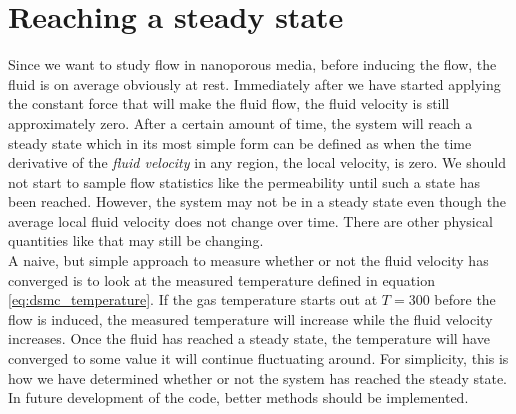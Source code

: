 \section{Reaching a steady state}
\label{sec:dsmc_steady_state}
Since we want to study flow in nanoporous media, before inducing the flow, the fluid is on average obviously at rest. Immediately after we have started applying the constant force that will make the fluid flow, the fluid velocity is still approximately zero. After a certain amount of time, the system will reach a steady state which in its most simple form can be defined as when the time derivative of the \textit{fluid velocity} in any region, the local velocity, is zero. We should not start to sample flow statistics like the permeability until such a state has been reached. However, the system may not be in a steady state even though the average local fluid velocity does not change over time. There are other physical quantities like that may still be changing.\\
A naive, but simple approach to measure whether or not the fluid velocity has converged is to look at the measured temperature defined in equation \eqref{eq:dsmc_temperature}. If the gas temperature starts out at $T= $\unit{300}{\kelvin} before the flow is induced, the measured temperature will increase while the fluid velocity increases. Once the fluid has reached a steady state, the temperature will have converged to some value it will continue fluctuating around. For simplicity, this is how we have determined whether or not the system has reached the steady state. In future development of the code, better methods should be implemented.